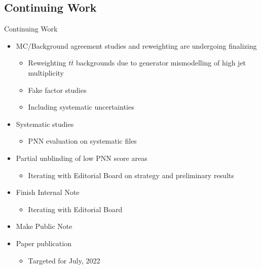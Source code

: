 \documentclass[aspectratio=169,xcolor=table]{beamer}
\begin{document}

  \subsection{Continuing Work}

    \begin{frame}[t]{Continuing Work}
      \begin{itemize}
        \item MC/Background agreement studies and reweighting are undergoing finalizing
        \begin{itemize}
          \item Reweighting $t\bar{t}$ backgrounds due to generator mismodelling of high jet multiplicity
          \item Fake factor studies
          \item Including systematic uncertainties
        \end{itemize}
        \item Systematic studies
        \begin{itemize}
          \item PNN evaluation on systematic files
        \end{itemize}
        \item Partial unblinding of low PNN score areas
        \begin{itemize}
          \item Iterating with Editorial Board on strategy and preliminary results
        \end{itemize}
        \item Finish Internal Note
        \begin{itemize}
          \item Iterating with Editorial Board
        \end{itemize}
        \item Make Public Note
        \item Paper publication
        \begin{itemize}
          \item Targeted for July, 2022
        \end{itemize}
      \end{itemize}
    \end{frame}
\end{document}
